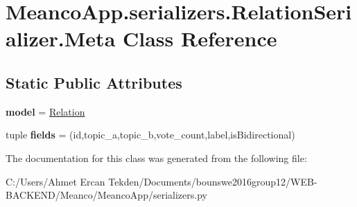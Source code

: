 \hypertarget{class_meanco_app_1_1serializers_1_1_relation_serializer_1_1_meta}{}\section{Meanco\+App.\+serializers.\+Relation\+Serializer.\+Meta Class Reference}
\label{class_meanco_app_1_1serializers_1_1_relation_serializer_1_1_meta}
\subsection*{Static Public Attributes}
\begin{DoxyCompactItemize}
\item 
\hypertarget{class_meanco_app_1_1serializers_1_1_relation_serializer_1_1_meta_a4b74785cca78a2d54ab9a5005a30eee8}{}\label{class_meanco_app_1_1serializers_1_1_relation_serializer_1_1_meta_a4b74785cca78a2d54ab9a5005a30eee8} 
{\bfseries model} = \hyperlink{class_meanco_app_1_1models_1_1relation_1_1_relation}{Relation}
\item 
\hypertarget{class_meanco_app_1_1serializers_1_1_relation_serializer_1_1_meta_ae25fd0bf031e16dc6225a7651ea78543}{}\label{class_meanco_app_1_1serializers_1_1_relation_serializer_1_1_meta_ae25fd0bf031e16dc6225a7651ea78543} 
tuple {\bfseries fields} = (\textquotesingle{}id\textquotesingle{},\textquotesingle{}topic\+\_\+a\textquotesingle{},\textquotesingle{}topic\+\_\+b\textquotesingle{},\textquotesingle{}vote\+\_\+count\textquotesingle{},\textquotesingle{}label\textquotesingle{},\textquotesingle{}is\+Bidirectional\textquotesingle{})
\end{DoxyCompactItemize}


The documentation for this class was generated from the following file\+:\begin{DoxyCompactItemize}
\item 
C\+:/\+Users/\+Ahmet Ercan Tekden/\+Documents/bounswe2016group12/\+W\+E\+B-\/\+B\+A\+C\+K\+E\+N\+D/\+Meanco/\+Meanco\+App/serializers.\+py\end{DoxyCompactItemize}
